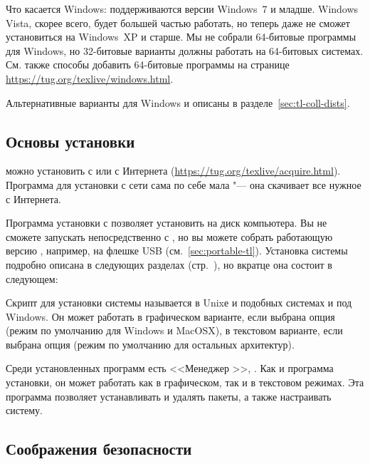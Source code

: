 \documentclass{article}
\def\p.{стр.~}%
\begin{document}
Что касается Windows: поддерживаются версии Windows~7 и
младше. Windows Vista, скорее всего, будет большей частью работать, но
\TL{} теперь даже не сможет установиться на Windows~XP и старше.  Мы не
собрали 64-битовые программы для Windows, но 32-битовые варианты
должны работать на 64-битовых системах.  См. также способы добавить
64-битовые программы на странице
\url{https://tug.org/texlive/windows.html}.  

Альтернативные варианты для Windows и \MacOSX{} описаны в
разделе~\ref{sec:tl-coll-dists}. 

\subsection{Основы установки \protect\TL{}}
\label{sec:basic}

\TL{} можно установить с \DVD{} или с Интернета
(\url{https://tug.org/texlive/acquire.html}).  Программа для установки
с сети сама по себе мала "--- она скачивает все нужное с Интернета.

Программа установки с \DVD{} позволяет установить \TL{} на диск
компьютера.  Вы не сможете запускать \TL{} непосредственно с \DVD{},
но вы можете собрать работающую версию \TL, например, на флешке USB
(см.~\ref{sec:portable-tl}).  Установка системы подробно описана в
следующих разделах (\p.\pageref{sec:install}), но вкратце она состоит
в следующем:
\begin{itemize*}

\item Скрипт для установки системы называется  в
  Unixе и подобных системах и  под
  Windows.  Он может работать в графическом варианте, если выбрана
  опция  (режим по умолчанию для Windows и MacOSX), в
  текстовом варианте, если выбрана опция  (режим по
  умолчанию для остальных архитектур). 

\item Среди установленных программ есть <<Менеджер \TL{}>>,
  .  Как и программа установки, он может работать как в
  графическом, так и в текстовом режимах.  Эта программа позволяет
  устанавливать и удалять пакеты, а также настраивать систему.  
\end{itemize*}

\subsection{Соображения безопасности}
\label{sec:security}
\end{document}
